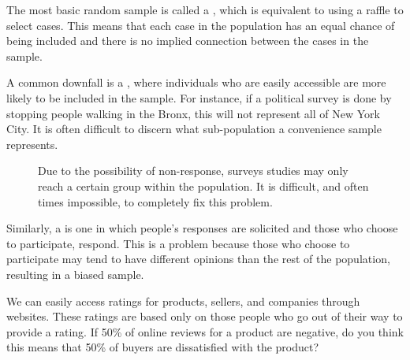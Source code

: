 The most basic random sample is called a , which is equivalent to using a raffle to select cases. This means that each case in the population has an equal chance of being included and there is no implied connection between the cases in the sample.

A common downfall is a , where individuals who are easily accessible are more likely to be included in the sample. For instance, if a political survey is done by stopping people walking in the Bronx, this will not represent all of New York City. It is often difficult to discern what sub-population a convenience sample represents.

\begin{figure}[h]
\centering
\caption{Due to the possibility of non-response, surveys studies may only reach a certain group within the population. It is difficult, and often times impossible, to completely fix this problem.}
\label{surveySample}
\end{figure}

\D{\newpage}

Similarly, a  is one in which people's responses are solicited and those who choose to participate, respond. This is a problem because those who choose to participate may tend to have different opinions than the rest of the population, resulting in a biased sample.

\begin{exercisewrap}
\begin{nexercise}
We can easily access ratings for products, sellers, and companies through websites. These ratings are based only on those people who go out of their way to provide a rating. If 50\% of online reviews for a product are negative, do you think this means that 50\% of buyers are dissatisfied with the product?\footnotemark
\end{nexercise}
\end{exercisewrap}

